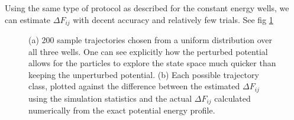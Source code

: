 \documentclass[paper=a4, fontsize=10pt]{article} %
\numberwithin{equation}{section} %
\numberwithin{figure}{section} %
\numberwithin{table}{section} %
\begin{document}
Using the same type of protocol as described for the constant energy wells, we can estimate $\Delta F_{ij}$ with decent accuracy and relatively few trials. See fig \ref{fig:MetastableSims}
\begin{figure}
\centering
{}
\caption{(a) 200 sample trajectories chosen from a uniform distribution over all three wells. One can see explicitly how the perturbed potential allows for the particles to explore the state space much quicker than keeping the unperturbed potential. (b) Each possible trajectory class, plotted against the difference between the estimated $\Delta F_{ij}$ using the simulation statistics and the actual $\Delta F_{ij}$ calculated numerically from the exact potential energy profile.}
\label{fig:MetastableSims}
\end{figure}
\end{document}
